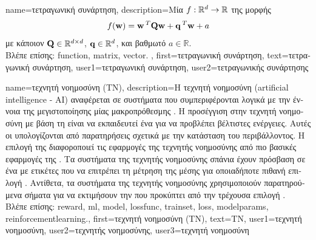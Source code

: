 {name={\foreignlanguage{greek}{τετραγωνική συνάρτηση}},
	description={\foreignlanguage{greek}{Μία}  
		$f: \mathbb{R}^{d} \rightarrow \mathbb{R}$ \foreignlanguage{greek}{της μορφής}  
		$$f({\bf w}) =  {\bf w}\,^{T} \mathbf{Q} \mathbf{w} + \mathbf{q}\,^{T} {\bf w}+a$$  
		\foreignlanguage{greek}{με κάποιον}  $\mathbf{Q} \in \mathbb{R}^{d \times d}$, 
		 ${\bf q} \in \mathbb{R}^{d}$, \foreignlanguage{greek}{και βαθμωτό} $a \in \mathbb{R}$. \\
		\foreignlanguage{greek}{Βλέπε επίσης:} \gls{function}, \gls{matrix}, \gls{vector}. },
	first={\foreignlanguage{greek}{τετραγωνική συνάρτηση}},
	text={\foreignlanguage{greek}{τετραγωνική συνάρτηση}},
	user1={\foreignlanguage{greek}{τετραγωνική συνάρτηση}}, %
  	user2={\foreignlanguage{greek}{τετραγωνικής συνάρτησης}} %
}

{name={\foreignlanguage{greek}{τεχνητή νοημοσύνη (ΤΝ)}}, 
	description={\foreignlanguage{greek}{Η τεχνητή νοημοσύνη} (artificial intelligence - AI) 
		\foreignlanguage{greek}{αναφέρεται σε συστήματα που συμπεριφέρονται λογικά με την έννοια της  
		μεγιστοποίησης μίας μακροπρόθεσμης} . \foreignlanguage{greek}{Η προσέγγιση στην τεχνητή νοημοσύνη με βάση
		τη}  \foreignlanguage{greek}{είναι να εκπαιδευτεί ένα}  \foreignlanguage{greek}{για   
		να προβλέπει βέλτιστες ενέργειες. Αυτές οι}  \foreignlanguage{greek}{υπολογίζονται από 
		παρατηρήσεις σχετικά με την κατάσταση του περιβάλλοντος. Η επιλογή της} 
		 \foreignlanguage{greek}{διαφοροποιεί τις εφαρμογές της τεχνητής νοημοσύνης από πιο βασικές  
		εφαρμογές της} . \foreignlanguage{greek}{Τα συστήματα της τεχνητής νοημοσύνης σπάνια έχουν 
		πρόσβαση σε ένα}  \foreignlanguage{greek}{με ετικέτες που να επιτρέπει τη μέτρηση της 
		μέσης}  \foreignlanguage{greek}{για οποιαδήποτε πιθανή επιλογή} . 
		\foreignlanguage{greek}{Αντίθετα, τα συστήματα της τεχνητής νοημοσύνης χρησιμοποιούν παρατηρούμενα σήματα}  
		 \foreignlanguage{greek}{για να εκτιμήσουν την}  \foreignlanguage{greek}{που 
		προκύπτει από την τρέχουσα επιλογή} .\\
		\foreignlanguage{greek}{Βλέπε επίσης:} \gls{reward}, \gls{ml}, \gls{model}, \gls{lossfunc}, \gls{trainset}, \gls{loss}, \gls{modelparams}, \gls{reinforcementlearning}.},
	first={\foreignlanguage{greek}{τεχνητή νοημοσύνη (ΤΝ)}},
	text={\foreignlanguage{greek}{ΤΝ}},
	user1={\foreignlanguage{greek}{τεχνητή νοημοσύνη}}, %
	user2={\foreignlanguage{greek}{τεχνητής νοημοσύνης}}, %
	user3={\foreignlanguage{greek}{τεχνητή νοημοσύνη}} %
}

